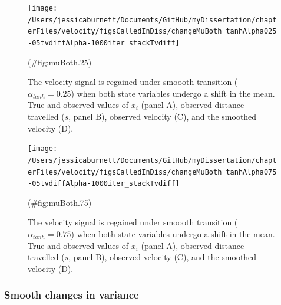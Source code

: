 \documentclass[12pt,twoside,openany]{reedthesis}
\begin{document}
\begin{figure}
\texttt{[image: /Users/jessicaburnett/Documents/GitHub/myDissertation/chapterFiles/velocity/figsCalledInDiss/changeMuBoth\_tanhAlpha025-05tvdiffAlpha-1000iter\_stackTvdiff]} \caption{The velocity signal is regained under smoooth transition ($\alpha_{tanh}=0.25$) when both state variables undergo a shift in the mean. True and observed values of $x_i$ (panel A), observed distance travelled ($s$, panel B), observed velocity (C), and the smoothed velocity (D). }(\#fig:muBoth.25)
\end{figure}
\begin{figure}
\texttt{[image: /Users/jessicaburnett/Documents/GitHub/myDissertation/chapterFiles/velocity/figsCalledInDiss/changeMuBoth\_tanhAlpha075-05tvdiffAlpha-1000iter\_stackTvdiff]} \caption{The velocity signal is regained under smoooth transition ($\alpha_{tanh}=0.75$) when both state variables undergo a shift in the mean. True and observed values of $x_i$ (panel A), observed distance travelled ($s$, panel B), observed velocity (C), and the smoothed velocity (D). }(\#fig:muBoth.75)
\end{figure}
\hypertarget{smooth-changes-in-variance}{%
\subsubsection{Smooth changes in variance}\label{smooth-changes-in-variance}}
\end{document}

